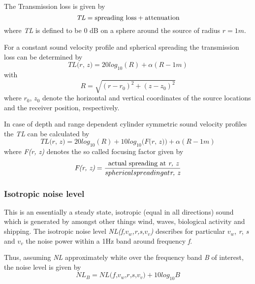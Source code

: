 \noindent The Transmission loss is given by
\begin{equation}
\textit{TL} = \textnormal{spreading loss} + \textnormal{attenuation} 
\end{equation}
\noindent where \textit{TL} is defined to be 0 dB on a sphere around the source of radius $\textit{r} = 1m.$

\noindent For a constant sound velocity profile and spherical spreading the transmission loss can be determined by
\begin{equation}
\textit{TL(r, z)} = 20 log_{10}{(R)} + \alpha (\textit{R} - 1m)
\end{equation}
\noindent with
\begin{equation}
\textit{R} = \sqrt{ (\textit{r} - \textit{$r_{0}$})^{2} + (\textit{z} - \textit{$z_{0}$})^{2} }
\end{equation}
\noindent where \textit{$r_{0}$}, \textit{$z_{0}$} denote the horizontal and vertical coordinates of the source locations and the receiver position, respectively.

\noindent In case of depth and range dependent cylinder symmetric sound velocity profiles the \textit{TL} can be calculated by
\begin{equation}
\textit{TL(r, z)} = 20 log_{10}{(R)} + 10log_{10}{(\textit{F(r, z))}}  + \alpha (\textit{R} - 1m)
\end{equation}
\noindent where \textit{F(r, z)} denotes the so called focusing factor given by
\begin{equation}
\textit{F(r, z)} = \frac{ \textnormal{ actual spreading at \textit{r, z}}}{ spherical spreading at \textit{r, z}}
\end{equation}

\subsubsection{ Isotropic noise level } \label{ Isotropic noise level }
\noindent This is an essentially a steady state, isotropic (equal in all directions) sound which is generated by amongst other things wind, waves, biological activity and shipping. The isotropic noise level \textit{NL(f,$v_w$,r,s,$v_v$)} describes for particular \textit{$v_w$}, \textit{r}, \textit{s} and \textit{$v_v$} the noise power within a 1Hz band around frequency \textit{f}.

\noindent Thus, assuming \textit{NL} approximately white over the frequency band \textit{B} of interest, the noise level is given by
\begin{equation}
\textit{$NL_B$} = \textit{NL(f,$v_w$,r,s,$v_v$)} + 10log_{10}{\textit{B}}
\end{equation}

